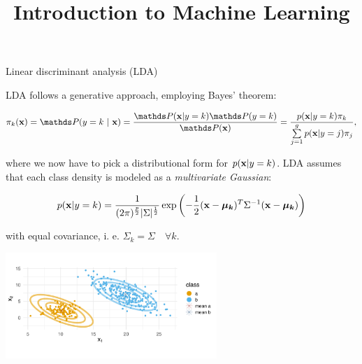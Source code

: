 \documentclass[11pt,compress,t,notes=noshow, xcolor=table]{beamer}
\title{Introduction to Machine Learning}
\begin{document}

\begin{vbframe}{Linear discriminant analysis (LDA)}

\begin{small}
LDA follows a generative approach, employing Bayes' theorem:

$$\pikx = \postk = \frac{\P(\xv | y = k) \P(y = k)}{\P(\xv)} = \frac{\pdfxyk \pik}{\sumjg \pdfxyk[j] \pi_j},$$

where we now have to pick a distributional form for $p(\mathbf{x} | y= k)$. LDA assumes that each class density is modeled as a \emph{multivariate Gaussian}:

$$
p(\mathbf{x} | y= k) = \frac{1}{(2\pi)^{\frac{p}{2}}|\Sigma|^{\frac{1}{2}}} \exp\left(-\frac{1}{2}(\mathbf{x} - \bm{\mu_{k}})^T \Sigma^{-1} (\mathbf{x} - \bm{\mu_{k}})\right)
$$

with equal covariance, i. e. $\Sigma_k = \Sigma \quad \forall k$.
\end{small}

\vspace{-0.9em}
\begin{center}
\includegraphics[width=0.60\textwidth, clip=true, trim={0 75 0 45}]{figure/disc_analysis-lda_2.png}
\end{center}
\end{vbframe}
\end{document}
